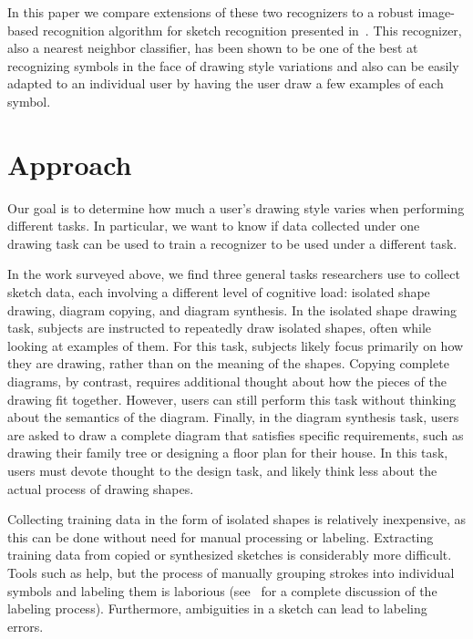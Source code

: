 \documentclass[final,5p,twocolumn]{elsarticle}
\begin{document}
In this paper we compare extensions of these two recognizers to a
robust image-based recognition algorithm for sketch recognition
presented in~\cite{Kara2005ImageBased}.  This recognizer, also a
nearest neighbor classifier, has been shown to be one of the best at
recognizing symbols in the face of drawing style variations and also
can be easily adapted to an individual user by having the user draw a
few examples of each symbol.


\section{Approach}

Our goal is to determine how much a user's drawing style varies when
performing different tasks.  In particular, we want to know if
data collected under one drawing task can be used to train a recognizer to
be used under a different task.

In the work surveyed above, we find three general tasks researchers
use to collect sketch data, each involving a different level of
cognitive load: isolated shape drawing, diagram copying, and diagram
synthesis.  In the isolated shape drawing task, subjects are
instructed to repeatedly draw isolated shapes, often while looking at examples of
them.  For this task, subjects likely focus primarily on how they are
drawing, rather than on the meaning of the shapes.  Copying complete
diagrams, by contrast, requires additional thought about how the
pieces of the drawing fit together. However, users can still perform
this task without thinking about the semantics of the diagram.
Finally, in the diagram synthesis task, users are asked to draw a
complete diagram that satisfies specific requirements, such as
drawing their family tree or designing a floor plan for their house.
In this task, users must devote thought to the design task, and likely
think less about the actual process of drawing shapes.

Collecting training data in the form of isolated shapes is relatively
inexpensive, as this can be done without need for manual processing or
labeling. Extracting training data from copied or synthesized sketches
is considerably more difficult. Tools such as
\cite{Wolin2007Labeler,Paulson2008SOUSA,Blagojevic2008Data} help, but
the process of manually grouping strokes into individual symbols and
labeling them is laborious (see~\cite{Wolin2007Labeler} for a complete
discussion of the labeling process). Furthermore, ambiguities in a
sketch can lead to labeling errors.
\end{document}

